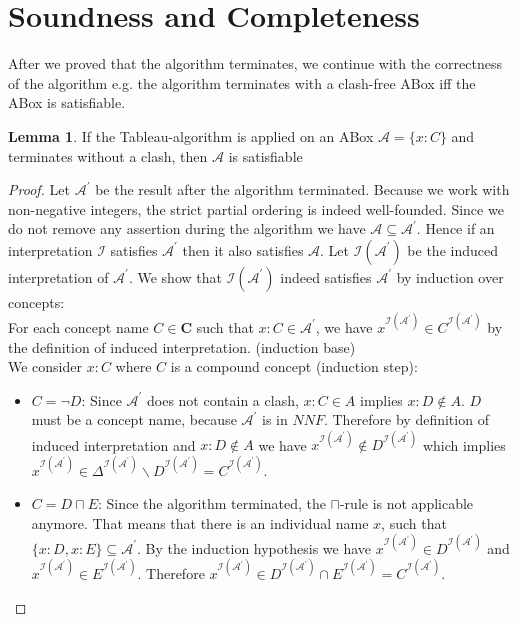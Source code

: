 \documentclass{book}
\theoremstyle{break}
\theoremstyle{definition}
\newtheorem{mylem}{Lemma}
\begin{document}
\section{Soundness and Completeness}
After we proved that the algorithm terminates, we continue with the correctness of the algorithm e.g. the algorithm terminates with a clash-free ABox iff the ABox is satisfiable.
\begin{mylem}
If the Tableau-algorithm is applied on an ABox $\mathcal{A}=\{x:C\}$ and  terminates without a clash, then $\mathcal{A}$ is satisfiable
\end{mylem}
\begin{proof}
Let $\mathcal{A}^\prime$ be the result after the algorithm terminated. Because we work with non-negative integers, the strict partial ordering is indeed well-founded. Since we do not remove any assertion during the algorithm we have $\mathcal{A}\subseteq\mathcal{A}^\prime$. Hence if an interpretation $\mathcal{I}$ satisfies $\mathcal{A}^\prime$ then it also satisfies $\mathcal{A}$. Let $\mathcal{I}(\mathcal{A}^\prime)$ be the induced interpretation of $\mathcal{A}^\prime$. We show that $\mathcal{I}(\mathcal{A}^\prime)$ indeed satisfies $\mathcal{A}^\prime$ by induction over concepts:\\
For each concept name $C\in\mathbf{C}$ such that $x:C\in\mathcal{A}^\prime$, we have $x^{\mathcal{I}(\mathcal{A}^\prime)}\in C^{\mathcal{I}(\mathcal{A}^\prime)}$ by the definition of induced interpretation. (induction base)\\
We consider $x:C$ where $C$ is a compound concept (induction step):
\begin{itemize}
\item $C=\neg D$: Since $\mathcal{A}^\prime$ does not contain a clash, $x:C\in A$ implies $x:D\notin A$. $D$ must be a concept name, because $\mathcal{A}^\prime$ is in $NNF$. Therefore by definition of induced interpretation and $x:D\notin A$ we have $x^{\mathcal{I}(\mathcal{A}^\prime)}\notin D^{\mathcal{I}(\mathcal{A}^\prime)}$ which implies $x^{\mathcal{I}(\mathcal{A}^\prime)}\in \Delta^{\mathcal{I}(\mathcal{A}^\prime)}\backslash D^{\mathcal{I}(\mathcal{A}^\prime)}=C^{\mathcal{I}(\mathcal{A}^\prime)}$.
\item $C=D\sqcap E$: Since the algorithm terminated, the $\sqcap$-rule is not applicable anymore. That means that there is an individual name $x$, such that $\{x:D, x:E\}\subseteq \mathcal{A}^\prime$. By the induction hypothesis we have $x^{\mathcal{I}(\mathcal{A}^\prime)}\in D^{\mathcal{I}(\mathcal{A}^\prime)}$ and $x^{\mathcal{I}(\mathcal{A}^\prime)}\in E^{\mathcal{I}(\mathcal{A}^\prime)}$. Therefore $x^{\mathcal{I}(\mathcal{A}^\prime)}\in D^{\mathcal{I}(\mathcal{A}^\prime)}\cap E^{\mathcal{I}(\mathcal{A}^\prime)}=C^{\mathcal{I}(\mathcal{A}^\prime)}$.

\end{itemize}
\end{proof}
\end{document}

